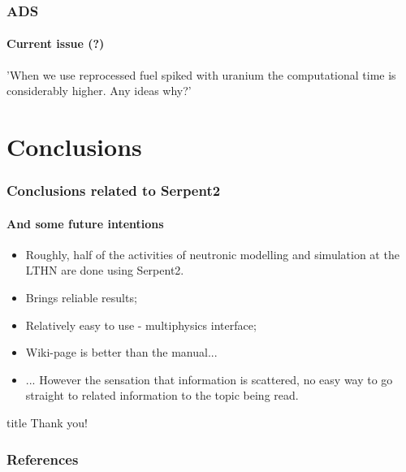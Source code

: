 \documentclass[svgnames,smaller,table]{beamer}
\begin{document}
\begin{frame}
  \frametitle{ADS}
  \framesubtitle{Current issue (?)}
  'When we use reprocessed fuel spiked with uranium the computational time is considerably higher. Any ideas why?'
\end{frame}


\section{Conclusions}
\begin{frame}
  \frametitle{Conclusions related to Serpent2}
  \framesubtitle{And some future intentions}
  \begin{itemize}
  \item Roughly, half of the activities of neutronic modelling and simulation at the LTHN are done using Serpent2.
  \item Brings reliable results;
  \item Relatively easy to use - multiphysics interface;
  \item Wiki-page is better than the manual...
  \item ... However the sensation that information is scattered, no easy way to go straight to related information to the topic being read.
  \end{itemize}
\end{frame}



\begin{frame}
 \vfill
  \begin{beamercolorbox}[center]{title}
     \Huge{Thank you!}
  \end{beamercolorbox}
  \vfill
\end{frame}

\begin{frame}
    \frametitle{References}
    
    
\end{frame}
\end{document}
